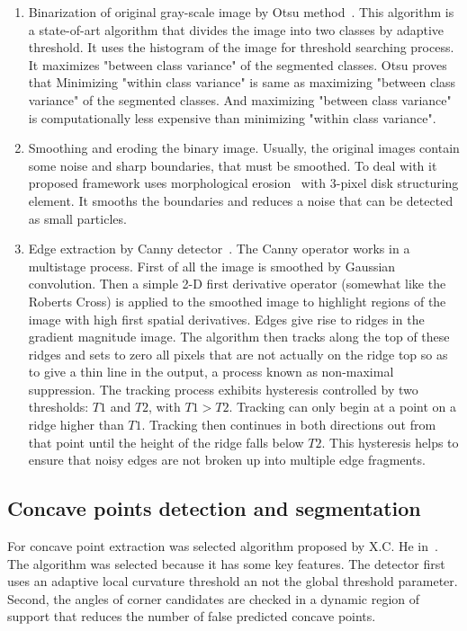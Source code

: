 \documentclass{lutmscthesis}[2010/09/22]
\begin{document}
\begin{enumerate}
    \item Binarization of original gray-scale image by Otsu method~\cite{otsu}. This algorithm is a state-of-art algorithm that divides the image into two classes by adaptive threshold. It uses the histogram of the image for threshold searching process. It maximizes "between class variance" of the segmented classes. Otsu proves that Minimizing "within class variance" is same as maximizing "between class variance" of the segmented classes. And maximizing "between class variance" is computationally less expensive than minimizing "within class variance".
    \item Smoothing and eroding the binary image. Usually, the original images contain some noise and sharp boundaries, that must be smoothed. To deal with it proposed framework uses morphological erosion~\cite{UECS} with 3-pixel disk structuring element. It smooths the boundaries and reduces a noise that can be detected as small particles.
    \item Edge extraction by Canny detector~\cite{Canny}. The Canny operator works in a multistage process. First of all the image is smoothed by Gaussian convolution. Then a simple 2-D first derivative operator (somewhat like the Roberts Cross) is applied to the smoothed image to highlight regions of the image with high first spatial derivatives. Edges give rise to ridges in the gradient magnitude image. The algorithm then tracks along the top of these ridges and sets to zero all pixels that are not actually on the ridge top so as to give a thin line in the output, a process known as non-maximal suppression. The tracking process exhibits hysteresis controlled by two thresholds: $T1$ and $T2$, with $T1 > T2$. Tracking can only begin at a point on a ridge higher than $T1$. Tracking then continues in both directions out from that point until the height of the ridge falls below $T2$. This hysteresis helps to ensure that noisy edges are not broken up into multiple edge fragments.
\end{enumerate}

\subsection{Concave points detection and segmentation}

For concave point extraction was selected algorithm proposed by X.C. He in~\cite{CSS}. The algorithm was selected because it has some key features.  The detector first uses an adaptive local curvature threshold an not the global threshold parameter. Second, the angles of corner candidates are checked in a dynamic region of support that reduces the number of false predicted concave points.
\end{document}
